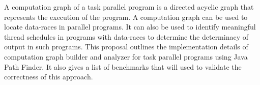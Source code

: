 A computation graph of a task parallel program is a directed acyclic graph that represents the execution of the program. A computation graph can be used to locate data-races in parallel programs. It can also be used to identify meaningful thread schedules in programs with data-races to determine the determinacy of output in such programs. This proposal outlines the implementation details of computation graph builder and analyzer for task parallel programs using Java Path Finder. It also gives a list of benchmarks that will used to  validate the correctness of this approach.

